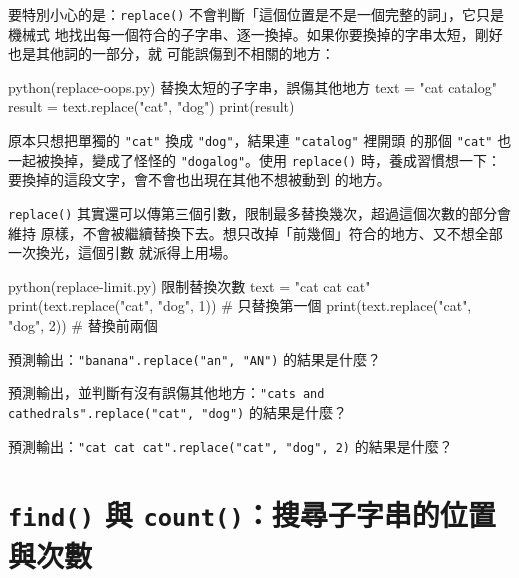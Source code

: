 
要特別小心的是：\texttt{replace()} 不會判斷「這個位置是不是一個完整的詞」，它只是機械式
地找出每一個符合的子字串、逐一換掉。如果你要換掉的字串太短，剛好也是其他詞的一部分，就
可能誤傷到不相關的地方：

\begin{example}{python}{(replace-oops.py) 替換太短的子字串，誤傷其他地方}
text = "cat catalog"
result = text.replace("cat", "dog")
print(result)
\end{example}


原本只想把單獨的 \texttt{"cat"} 換成 \texttt{"dog"}，結果連 \texttt{"catalog"} 裡開頭
的那個 \texttt{"cat"} 也一起被換掉，變成了怪怪的 \texttt{"dogalog"}。使用
\texttt{replace()} 時，養成習慣想一下：要換掉的這段文字，會不會也出現在其他不想被動到
的地方。

\texttt{replace()} 其實還可以傳第三個引數，限制最多替換幾次，超過這個次數的部分會維持
原樣，不會被繼續替換下去。想只改掉「前幾個」符合的地方、又不想全部一次換光，這個引數
就派得上用場。

\begin{example}{python}{(replace-limit.py) 限制替換次數}
text = "cat cat cat"
print(text.replace("cat", "dog", 1))   # 只替換第一個
print(text.replace("cat", "dog", 2))   # 替換前兩個
\end{example}


\begin{drills}[label=drills:replace-method]
\item 預測輸出：\texttt{"banana".replace("an", "AN")} 的結果是什麼？
\item 預測輸出，並判斷有沒有誤傷其他地方：\texttt{"cats and cathedrals".replace("cat",
"dog")} 的結果是什麼？
\item 預測輸出：\texttt{"cat cat cat".replace("cat", "dog", 2)} 的結果是什麼？
\end{drills}

\section{\texttt{find()} 與 \texttt{count()}：搜尋子字串的位置與次數}
\label{sec:find-count}

